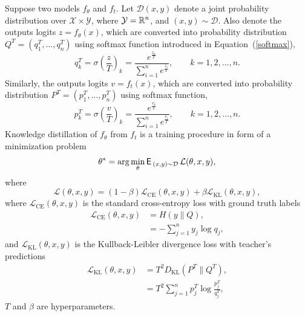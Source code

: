 \begin{defn}
	Suppose two models $f_\theta$ and $f_t$. Let $\mathcal{D}(x,y)$ denote a joint probability distribution over $\mathcal{X} \times \mathcal{Y}$, where $\mathcal{Y} = \mathbb{R}^n$, and $(x,y) \sim \mathcal{D}$. Also denote the outputs logits $z=f_\theta(x)$, which are converted into probability distribution $Q^T = (q^T_1,\dots,q^T_n)$ using softmax function introduced in Equation~(\ref{softmax}),
	\begin{equation*}
		q^T_k = \sigma \left( \frac{z}{T} \right)_k = \frac{e^\frac{z_k}{T}}{\sum_{i=1}^{n} e^\frac{z_i}{T}}, \qquad k = 1,2,\dots, n.
	\end{equation*}
	Similarly, the outputs logits $v=f_t(x)$, which are converted into probability distribution $P^T = (p^T_1,\dots,p^T_n)$ using softmax function,
	\begin{equation*}
		p^T_k = \sigma \left( \frac{v}{T} \right)_k = \frac{e^\frac{v_k}{T}}{\sum_{i=1}^{n} e^\frac{v_i}{T}}, \qquad k = 1,2,\dots, n.
	\end{equation*}
	Knowledge distillation of $f_\theta$ from $f_t$ is a training procedure in form of a minimization problem
	\begin{equation*}
		\theta^* = \arg \min_\theta \operatorname{\textsf{E}\,}_{(x,y) \sim \mathcal{D}} \mathcal{L}(\theta,x,y),
	\end{equation*}
	where
	\begin{equation}
		\mathcal{L}(\theta,x,y) = (1-\beta) \mathcal{L}_{\text{CE}}(\theta,x,y) + \beta \mathcal{L}_{\text{KL}}(\theta,x,y),
		\label{Knowledge Distillation Loss Function}
	\end{equation}
	where $\mathcal{L}_{\text{CE}}(\theta,x,y)$ is the standard cross-entropy loss with ground truth labels
	\begin{equation}
		\begin{aligned}
			\mathcal{L}_{\text{CE}}(\theta,x,y) &= H(y \| Q), \\
			&= - \sum_{j=1}^{n} y_{j} \log q_j,
			\label{CE loss}
		\end{aligned}
	\end{equation}
	and $\mathcal{L}_{\text{KL}}(\theta,x,y)$ is the Kullback-Leibler divergence loss with teacher's predictions
	\begin{equation}
		\begin{aligned}
			\mathcal{L}_{\text{KL}}(\theta,x,y) &= T^2 D_{\text{KL}}(P^T \| Q^T), \label{KL loss}\\
			&= T^2 \sum_{j=1}^{n} p^T_j \log \frac{p^T_j}{q^T_j},
		\end{aligned}
	\end{equation}
	$T$ and $\beta$ are hyperparameters.
	\label{Knowledge Distillation}
\end{defn}

